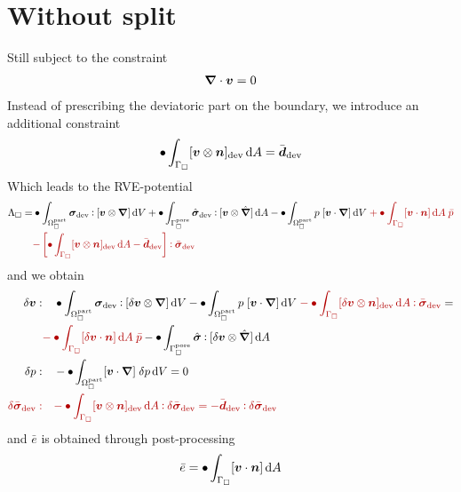 \documentclass[a4paper]{article}
\newcommand{\pore}{\mathrm{pore}}
\newcommand{\particle}{\mathrm{part}}
\newcommand{\highlight}[1]{{\color{red!70!black}#1}}
\begin{document}
\section*{Without split}
Still subject to the constraint
\begin{gather}
 \boldsymbol{\nabla} \cdot \boldsymbol{v} = 0
\end{gather}
Instead of prescribing the deviatoric part on the boundary, we introduce an additional constraint
\begin{gather}
 \bullet \int_{\Gamma_\Box}[\boldsymbol{v}\mathbin{\otimes}\boldsymbol{n}]_{\mathrm{dev}} \operatorname{d \!} A = \bar{\boldsymbol{d}}_{\mathrm{dev}}
\end{gather}
Which leads to the RVE-potential
\begin{align}
 \Lambda_\Box =& \bullet\int_{\Omega_\Box^\particle} \ts\sigma_\dev\dprod[\ta v\outerp\diff]\dif V + \bullet\int_{\Gamma_\Box^\pore} \hat{\ts\sigma}_\dev\dprod[\ta v\outerp\hat{\diff}]\dif A - \bullet\int_{\Omega_\Box^\particle} p\;[\ta v\cdot\diff] \dif V
 \;\highlight{+ \bullet\int_{\Gamma_\Box}[\ta v\cdot \ta n]\dif A\;\bar{p}}
 \nonumber\\
 &\highlight{- \left[\bullet \int_{\Gamma_\Box} [\ta v\outerp\ta n]_\dev\dif A - \bar{\ts d}_\dev\right]\dprod \bar{\ts\sigma}_\dev}
\end{align}
and we obtain
\begin{subequations}
\begin{align}
 \delta\ta v :&\quad 
 \bullet \int_{\Omega_\Box^\particle} \ts\sigma_\dev \dprod [\delta\ta v\outerp\diff]\dif V - \bullet\int_{\Omega_\Box^\particle} p\;[\ta v\cdot\diff] \dif V 
  \;\highlight{-\bullet \int_{\Gamma_\Box} [\delta\ta v\outerp\ta n]_\dev\dif A\dprod \bar{\ts\sigma}_\dev}
  = \nonumber\\&\highlight{-\bullet\int_{\Gamma_\Box}[\delta\ta v\cdot \ta n]\dif A\;\bar{p}} - \bullet\int_{\Gamma_\Box^\pore} \hat{\ts\sigma} \dprod [\delta\ta v\outerp\hat{\diff}]\dif A
 \\
 \delta p :&\quad 
 -\bullet \int_{\Omega_\Box^\particle} [\ta v\cdot\diff]\;\delta p\dif V = 0
 \\
 \highlight{\delta\bar{\ts\sigma}_\dev  :}&\highlight{\quad
 -\bullet \int_{\Gamma_\Box} [\ta v\outerp\ta n]_\dev\dif A \dprod \delta\bar{\ts\sigma}_\dev = -\bar{\ts d}_\dev \dprod \delta\bar{\ts\sigma}_\dev
 }
\end{align}
\end{subequations}
and $\bar{e}$ is obtained through post-processing
\begin{align}
 \bar{e} = \bullet\int_{\Gamma_\Box} [\boldsymbol{v} \cdot \boldsymbol{n}]\operatorname{d \!} A
\end{align}
\end{document}

